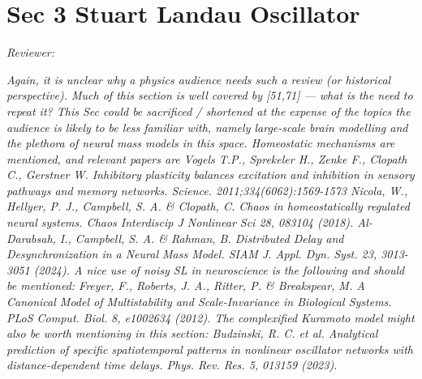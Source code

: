 \documentclass[12pt,a4paper]{article}
\newcommand{\reviewercomment}[1]{\par\smallskip\noindent\textit{Reviewer:}\par\smallskip\begingroup\itshape #1\par\endgroup\smallskip}
\begin{document}
\section*{Sec 3 Stuart Landau Oscillator}

\reviewercomment{Again, it is unclear why a physics audience needs such a review (or historical perspective). Much of this section is well covered by [51,71] --- what is the need to repeat it? This Sec could be sacrificed / shortened at the expense of the topics the audience is likely to be less familiar with, namely large-scale brain modelling and the plethora of neural mass models in this space. Homeostatic mechanisms are mentioned, and relevant papers are Vogels T.P., Sprekeler H., Zenke F., Clopath C., Gerstner W. Inhibitory plasticity balances excitation and inhibition in sensory pathways and memory networks. Science. 2011;334(6062):1569-1573 Nicola, W., Hellyer, P. J., Campbell, S. A. \& Clopath, C. Chaos in homeostatically regulated neural systems. Chaos Interdiscip J Nonlinear Sci 28, 083104 (2018). Al-Darabsah, I., Campbell, S. A. \& Rahman, B. Distributed Delay and Desynchronization in a Neural Mass Model. SIAM J. Appl. Dyn. Syst. 23, 3013-3051 (2024). A nice use of noisy SL in neuroscience is the following and should be mentioned: Freyer, F., Roberts, J. A., Ritter, P. \& Breakspear, M. A Canonical Model of Multistability and Scale-Invariance in Biological Systems. PLoS Comput. Biol. 8, e1002634 (2012). The complexified Kuramoto model might also be worth mentioning in this section: Budzinski, R. C. et al. Analytical prediction of specific spatiotemporal patterns in nonlinear oscillator networks with distance-dependent time delays. Phys. Rev. Res. 5, 013159 (2023).}
\end{document}
